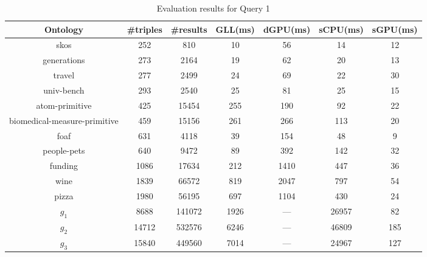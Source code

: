 \begin{table*}[ht]
\centering
\caption{Evaluation results for Query 1}
\label{tbl1}

\begin{tabular}{ | c | c | c | c | c | c | c |}
\hline
Ontology & \#triples & \#results & GLL(ms) & dGPU(ms) & sCPU(ms) & sGPU(ms) \\
\hline 
\hline
skos        & 252 & 810 & 10 & 56 & 14 & 12\\
generations & 273 & 2164 & 19 & 62 & 20 & 13\\
travel      & 277 & 2499 & 24 & 69 & 22 & 30\\
univ-bench  & 293 & 2540 & 25 & 81 & 25 & 15\\
atom-primitive & 425 & 15454 & 255 & 190 & 92 & 22\\
biomedical-measure-primitive & 459 & 15156 & 261 & 266 & 113 & 20\\
foaf        & 631 & 4118 & 39 & 154 & 48 & 9\\
people-pets & 640 & 9472 & 89 & 392 & 142 & 32\\
funding     & 1086 & 17634 & 212 & 1410 & 447 & 36\\
wine        & 1839 & 66572 & 819 & 2047 & 797 & 54\\
pizza       & 1980 & 56195 & 697 & 1104 & 430 & 24\\
$g_{1}$     & 8688 & 141072 & 1926 & --- & 26957 & 82\\
$g_{2}$     & 14712 & 532576 & 6246 & --- & 46809 & 185\\
$g_{3}$     & 15840 & 449560 & 7014 & --- & 24967 & 127\\
\hline
\end{tabular}

\end{table*}

